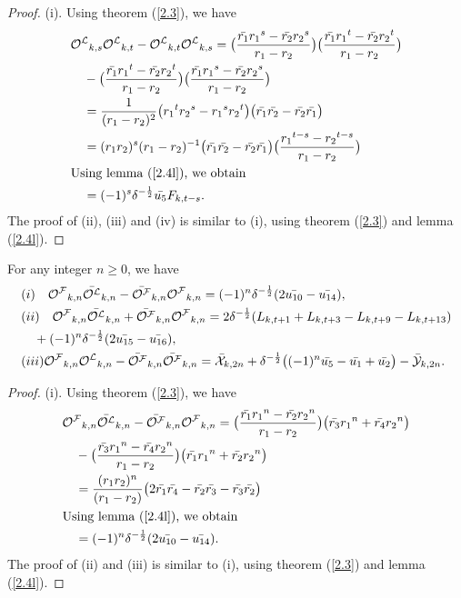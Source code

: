 \begin{proof}

(i). Using theorem (\ref{2.3}), we have
\begin{align*}
&{{\mathcal{O^L}}}_{k, s}{{\mathcal{O^L}}}_{k,t}-{{\mathcal{O^L}}}_{k,t}{{\mathcal{O^L}}}_{k,s}=\big(\frac{\bar{r_1}{r_1}^s-\bar{r_2}{r_2}^s}{r_1-r_2}\big)\big(\frac{\bar{r_1}{r_1}^t-\bar{r_2}{r_2}^t}{r_1-r_2}\big)\\
&\quad-\big(\frac{\bar{r_1}{r_1}^t-\bar{r_2}{r_2}^t}{r_1-r_2}\big)\big(\frac{\bar{r_1}{r_1}^s-\bar{r_2}{r_2}^s}{r_1-r_2}\big)\\
&\quad =\dfrac{1}{(r_1-r_2)^2}\big({r_1}^t{r_2}^s-{r_1}^s{r_2}^t\big)\big(\bar{r_1}\bar{r_{2}}-\bar{r_2}\bar{r_1}\big)\\
&\quad =(r_1r_2)^s(r_1-r_2)^{-1}\big(\bar{r_1}\bar{r_{2}}-\bar{r_2}\bar{r_1}\big)\big(\frac{{r_1}^{t-s}-{r_2}^{t-s}}{r_1-r_2}\big)\\
&\text{Using lemma (\ref{2.4l}), we obtain}\\
&\quad =(-1)^s{\delta}^{-\frac{1}{2}}\bar{u_5} F_{k, t-s}.
\end{align*}
The proof of (ii), (iii) and (iv) is similar to (i), using theorem (\ref{2.3}) and lemma (\ref{2.4l}).
\end{proof}
\begin{theorem} For any integer $n\ge 0$,  we have\label{2.15t}
\begin{align*}
&(i)\quad {{\mathcal{O^F}}}_{k, n}\bar{{{\mathcal{O^L}}}}_{k,n}-\bar{{{\mathcal{O^F}}}}_{k,n}{{\mathcal{O^F}}}_{k,n}=(-1)^n{\delta}^{-\frac{1}{2}}(2\bar{u_{10}}-\bar{u_{14}}),\\
&(ii)\quad {{\mathcal{O^F}}}_{k, n}\bar{{{\mathcal{O^L}}}}_{k,n}+\bar{{{\mathcal{O^F}}}}_{k,n}{{\mathcal{O^F}}}_{k,n}=2{\delta}^{-\frac{1}{2}}(L_{k,t+1}+L_{k,t+3}-L_{k,t+9}-L_{k,t+13})\\&\quad +(-1)^n{\delta}^{-\frac{1}{2}}(2\bar{u_{15}}-\bar{u_{16}}),\\
&(iii){{\mathcal{O^F}}}_{k, n}{{{\mathcal{O^L}}}}_{k,n}-\bar{{{\mathcal{O^F}}}}_{k,n}\bar{{{\mathcal{O^F}}}}_{k,n}=\bar{\mathcal{X}}_{k,2n}+{\delta}^{-\frac{1}{2}}\big((-1)^n\bar{u_5}-\bar{u_1}+\bar{u_2}\big)-\bar{\mathcal{Y}}_{k,2n}.\\
\end{align*}
\end{theorem}
\begin{proof}
(i). Using theorem (\ref{2.3}), we have
\begin{align*}
&{{\mathcal{O^F}}}_{k, n}\bar{{{\mathcal{O^L}}}}_{k,n}-\bar{{{\mathcal{O^F}}}}_{k,n}{{\mathcal{O^F}}}_{k,n}=\big(\frac{\bar{r_1}{r_1}^n-\bar{r_2}{r_2}^n}{r_1-r_2}\big)\big({\bar{r_3}{r_1}^n+\bar{r_4}{r_2}^n}\big)\\
&\quad-\big(\frac{\bar{r_3}{r_1}^n-\bar{r_4}{r_2}^n}{r_1-r_2}\big)\big({\bar{r_1}{r_1}^n+\bar{r_2}{r_2}^n}\big)\\
&\quad =\dfrac{(r_1r_2)^n}{(r_1-r_2)}\big(2\bar{r_1}\bar{r_4}-\bar{r_2}\bar{r_3}-\bar{r_3}\bar{r_2}\big)\\
&\text{Using lemma (\ref{2.4l}), we obtain}\\
&\quad =(-1)^n{\delta}^{-\frac{1}{2}}(2\bar{u_{10}}-\bar{u_{14}}).
\end{align*}
The proof of (ii) and (iii) is similar to (i), using theorem (\ref{2.3}) and lemma (\ref{2.4l}).
\end{proof}


